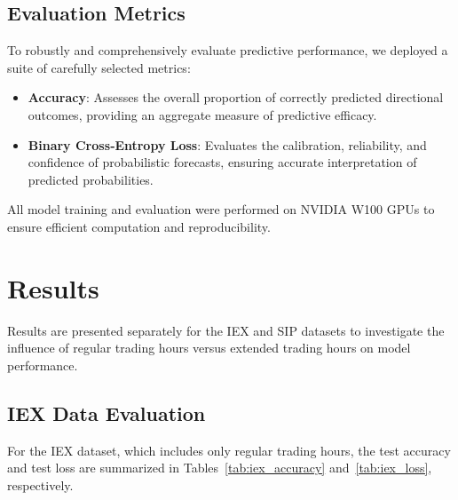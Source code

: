 \documentclass[letterpaper]{article}
\begin{document}
\subsection{Evaluation Metrics}

To robustly and comprehensively evaluate predictive performance, we deployed a suite of carefully selected metrics:

\begin{itemize}[noitemsep]
  \item \textbf{Accuracy}: Assesses the overall proportion of correctly predicted directional outcomes, providing an aggregate measure of predictive efficacy.
  \item \textbf{Binary Cross‑Entropy Loss}: Evaluates the calibration, reliability, and confidence of probabilistic forecasts, ensuring accurate interpretation of predicted probabilities.
\end{itemize}

All model training and evaluation were performed on NVIDIA W100 GPUs to ensure efficient computation and reproducibility.

\section{Results}

Results are presented separately for the IEX and SIP datasets to investigate the influence of regular trading hours versus extended trading hours on model performance.

\subsection{IEX Data Evaluation}

For the IEX dataset, which includes only regular trading hours, the test accuracy and test loss are summarized in Tables~\ref{tab:iex_accuracy} and~\ref{tab:iex_loss}, respectively.
\end{document}
